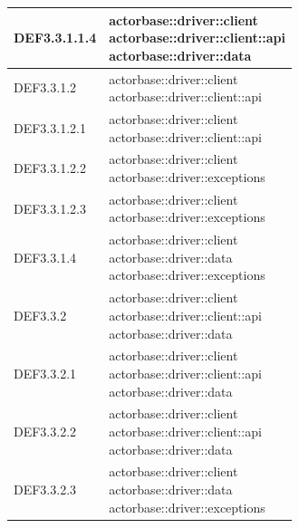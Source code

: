 \documentclass{scalatekids-article}
\begin{document}
\begin{longtable}[H]{|p{6cm}|p{11cm}|}
DEF3.3.1.1.4 & \multiLineCell[t]{actorbase::driver::client\\actorbase::driver::client::api\\actorbase::driver::data\\}\\
\hline
DEF3.3.1.2 & \multiLineCell[t]{actorbase::driver::client\\actorbase::driver::client::api\\}\\
\hline
DEF3.3.1.2.1 & \multiLineCell[t]{actorbase::driver::client\\actorbase::driver::client::api\\}\\
\hline
DEF3.3.1.2.2 & \multiLineCell[t]{actorbase::driver::client\\actorbase::driver::exceptions\\}\\
\hline
DEF3.3.1.2.3 & \multiLineCell[t]{actorbase::driver::client\\actorbase::driver::exceptions\\}\\
\hline
DEF3.3.1.4 & \multiLineCell[t]{actorbase::driver::client\\actorbase::driver::data\\actorbase::driver::exceptions\\}\\
\hline
DEF3.3.2 & \multiLineCell[t]{actorbase::driver::client\\actorbase::driver::client::api\\actorbase::driver::data\\}\\
\hline
DEF3.3.2.1 & \multiLineCell[t]{actorbase::driver::client\\actorbase::driver::client::api\\actorbase::driver::data\\}\\
\hline
DEF3.3.2.2 & \multiLineCell[t]{actorbase::driver::client\\actorbase::driver::client::api\\actorbase::driver::data\\}\\
\hline
DEF3.3.2.3 & \multiLineCell[t]{actorbase::driver::client\\actorbase::driver::data\\actorbase::driver::exceptions\\}\\
\hline

\end{longtable}
\end{document}
